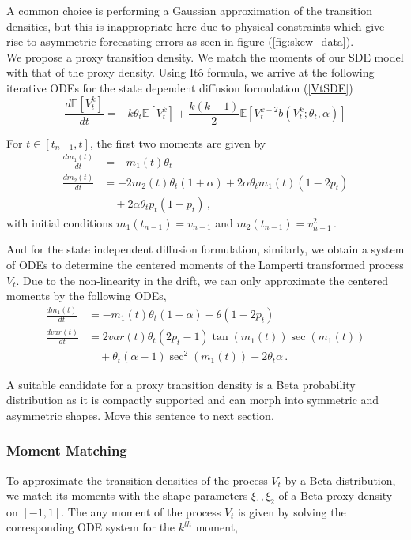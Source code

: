 \documentclass[11pt]{article}
\begin{document}
A common choice is performing a Gaussian approximation of the transition densities, but this is inappropriate here due to physical constraints which give rise to asymmetric forecasting errors as seen in figure (\ref{fig:skew_data}).\\

We propose a proxy transition density. We match the moments of our SDE model with that of the proxy density. Using It\^o formula, we arrive at the following iterative ODEs for the state dependent diffusion formulation (\ref{VtSDE})
\begin{equation}
\frac{d \mathbb{E}[ V^k_t]}{dt} = - k \theta_t \mathbb{E}[ V^k_t] + \frac{k(k-1)}{2} \mathbb{E}[ V^{k-2}_t  b(V^k_t;\theta_t, \alpha)]
\end{equation}

For $t\in [t_{n-1}, t]$, the first two moments are given by
\begin{align}
\frac{d m_1 (t)}{dt} &= - m_1(t)\theta_t   \nonumber \\
\frac{d m_2 (t)}{dt} &=  -2 m_2(t)\theta_t(1+\alpha) + 2\alpha\theta_t m_1(t)(1-2p_t)  \nonumber \\
&\quad + 2 \alpha\theta_t p_t (1-p_t) \,,
\end{align}
with initial conditions $m_1(t_{n-1})= v_{n-1}$ and $m_2(t_{n-1})= v_{n-1}^2 \,.$

And for the state independent diffusion formulation, similarly, we  obtain a system of ODEs to determine the centered moments of the Lamperti transformed process $V_t$. Due to the non-linearity in the drift, we can only approximate the centered moments by the following ODEs,
\begin{align}
\frac{d m_1 (t)}{dt} &= - m_1(t)\theta_t (1-\alpha) - \theta (1-2 p_t) \nonumber \\
\frac{d var(t)}{dt} &=  2 var(t) \theta_t (2p_t - 1 ) \tan(m_1 (t)) \sec(m_1 (t))   \nonumber \\
& \quad + \theta_t (\alpha - 1) \sec^2(m_1 (t))  + 2 \theta_t \alpha \,.
\end{align}

A suitable candidate for a proxy transition density is a Beta probability distribution as it is compactly supported and can morph into symmetric and asymmetric shapes. {\color{red} Move this sentence to next section.}

\subsubsection*{ Moment Matching}
To approximate the transition densities of  the process $V_t$ by a Beta distribution, we match its moments with the shape parameters $\xi_1, \xi_2$ of a Beta proxy density on $[-1,1]$. The any moment of the process $V_t$ is  given by solving the corresponding ODE system  for the $k^{th}$  moment,
\end{document}
